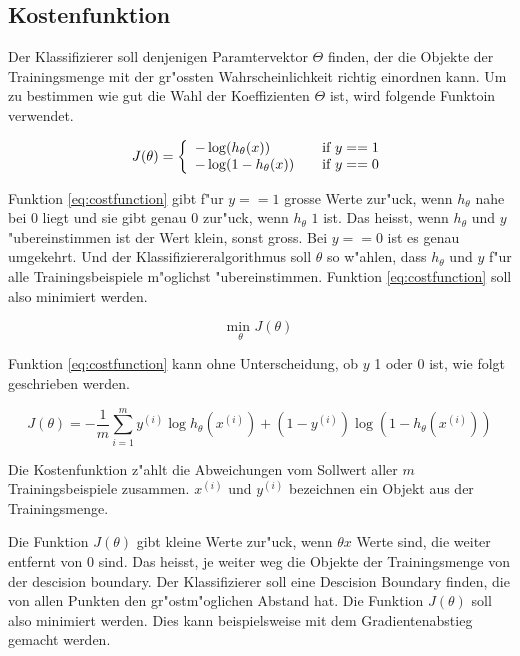 \documentclass[12pt,a4paper,twoside]{article}
\begin{document}
\subsection{Kostenfunktion}
\label{sec:costfunction}

Der Klassifizierer soll denjenigen Paramtervektor $\Theta$ finden, der die Objekte der Trainingsmenge mit der gr"ossten Wahrscheinlichkeit richtig einordnen kann. Um zu bestimmen wie gut die Wahl der Koeffizienten $\Theta$ ist, wird folgende Funktoin verwendet.

\begin{equation}
  \label{eq:costfunction}
  J(\theta) = \left \{
    \begin{array}{l l}
      -\log(h_{\theta} (x)) & \quad \text{if $y==1$}\\
      -\log(1-h_{\theta} (x)) & \quad \text{if $y==0$}
    \end{array} \right.
\end{equation}

Funktion \ref{eq:costfunction} gibt f"ur $y==1$ grosse Werte zur"uck, wenn $h_{\theta}$ nahe bei $0$ liegt und sie gibt genau $0$ zur"uck, wenn $h_{\theta}$ $1$ ist. Das heisst, wenn $h_{\theta}$ und $y$ "ubereinstimmen ist der Wert klein, sonst gross. Bei $y==0$ ist es genau umgekehrt. Und der Klassifiziereralgorithmus soll $\theta$ so w"ahlen, dass $h_{\theta}$ und $y$  f"ur alle Trainingsbeispiele m"oglichst "ubereinstimmen. Funktion \ref{eq:costfunction} soll also minimiert werden.

\begin{equation}
  \label{eq:minimize}
  \underset{\theta}{\text{min }} J(\theta)
\end{equation}

Funktion \ref{eq:costfunction} kann ohne Unterscheidung, ob $y$ 1 oder 0 ist, wie folgt geschrieben werden. 

\begin{equation}
  \label{eq:simplecostfunction}
  J( \theta ) = - \frac{1}{m} \sum_{i=1}^m y^{(i)} \log h_{\theta}(x^{(i)}) + (1 - y^{(i)}) \log(1 - h_{\theta}(x^{(i)}))
\end{equation}

Die Kostenfunktion z"ahlt die Abweichungen vom Sollwert aller $m$ Trainingsbeispiele zusammen. $x^{(i)}$ und $y^{(i)}$ bezeichnen ein Objekt aus der Trainingsmenge.

Die Funktion $J(\theta)$ gibt kleine Werte zur"uck, wenn $\theta x$ Werte sind, die weiter entfernt von 0 sind. Das heisst, je weiter weg die Objekte der Trainingsmenge von der descision boundary. Der Klassifizierer soll eine Descision Boundary finden, die von allen Punkten den gr"ostm"oglichen Abstand hat. Die Funktion $J(\theta)$ soll also minimiert werden. Dies kann beispielsweise mit dem Gradientenabstieg gemacht werden. 
\end{document}
